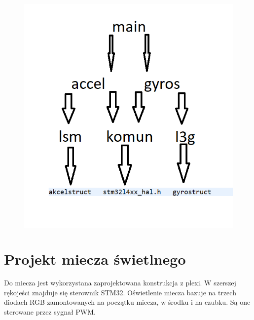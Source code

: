 \documentclass[10pt, a4paper]{article}
\begin{document}
	\begin{figure}[b]
	\centering
	\includegraphics[width=\linewidth]{bilio.png}
	\end{figure}

\section{Projekt miecza świetlnego}	
Do miecza jest wykorzystana zaprojektowana konstrukcja z plexi. W szerszej rękojeści znajduje się sterownik STM32. Oświetlenie miecza bazuje na trzech diodach RGB zamontowanych na początku miecza, w środku i na czubku. Są one sterowane przez sygnał PWM. 
	

\newpage
{}


\end{document}
